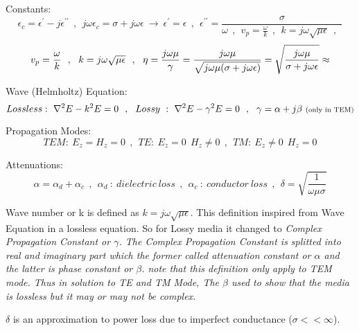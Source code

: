 Constants:
$$ {\epsilon}_c = {\epsilon}^{\prime} - j {\epsilon}^{\prime\prime}  ~~ , ~~ j \omega {\epsilon}_c = \sigma + j \omega \epsilon ~ \rightarrow ~  {\epsilon}^\prime = {\epsilon} ~~ , ~~ {\epsilon}^{\prime\prime} = \frac{\sigma}{\omega ~~ , ~~ v_p = \frac{\omega}{k} ~~ , ~~ k = j \omega \sqrt{\mu \epsilon}  ~~ , ~~ }$$
$$\\ v_p = \frac{\omega}{k} ~~ , ~~ k = j \omega \sqrt{\mu \epsilon}  ~~ , ~~ \eta = \frac{j \omega \mu}{\gamma} = \frac{j \omega \mu}{\sqrt{j \omega \mu (\sigma + j \omega \epsilon)}} = \sqrt{\frac{j \omega \mu}{\sigma + j \omega \epsilon}} \approx $$
\par
Wave (Helmholtz) Equation:
$$Lossless:~ \nabla^2 E - k^2 E = 0 ~~ , ~~ Lossy ~ : ~ \nabla^2 E - {\gamma}^2 E = 0 ~~ , ~~ \gamma = \alpha + j\beta~ \text{\scriptsize(only~in~TEM)}  $$
\par
Propagation Modes: 
$$TEM:~ E_z = H_z = 0 ~~ , ~~ TE:~ E_z = 0 ~~ H_z \neq 0 ~~ , ~~ TM:~ E_z \neq 0 ~~ H_z = 0 $$
\par
Attenuations: 
$$ \alpha = {\alpha}_d + {\alpha}_c ~~ , ~~ {\alpha}_d ~: ~ dielectric~loss ~~ , ~~ {\alpha}_c ~ : ~ conductor~loss  ~~ , ~~ \delta = \sqrt{\frac{1}{\omega \mu \sigma}} $$
\setlength{\parindent}{0.5cm} %
\par
Wave number or k is defined as $ k = j \omega \sqrt{\mu \epsilon} $. This definition inspired from Wave Equation in a lossless equation. So for Lossy media it changed to \it{Complex Propagation Constant} or $\gamma$.  The Complex Propagation Constant is splitted into real and imaginary part which the former called attenuation constant or $\alpha$ and the latter is phase constant or $\beta$. note that this definition only apply to TEM mode. Thus in solution to TE and TM Mode, The $\beta$ used to show that the media is lossless but it may or may not be complex.
\par
$\delta$ is an approximation to power loss due to imperfect conductance ($\sigma<<\infty$).
\par
\setlength{\parindent}{0.0cm} %
\begin{minipage}[b]{.49\textwidth}
\lipsum[1-2]
\end{minipage}%
\hspace{.02\textwidth}
\begin{minipage}[b]{.49\textwidth}
\lipsum[1-2]
\end{minipage}%
